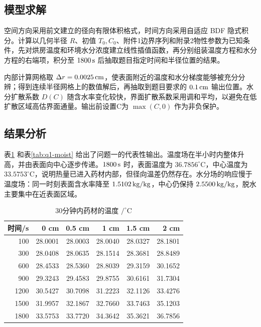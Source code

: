 \documentclass[UTF8,a4paper,12pt]{ctexart}
\begin{document}
\subsection{模型求解}
空间方向采用前文建立的径向有限体积格式，时间方向采用自适应 BDF 隐式积分。计算以几何半径 $R$、初值 $T_0,C_0$、附件1边界序列和附录2物性参数为已知条件，先对烘房温度和环境水分浓度建立线性插值函数，再分别组装温度方程和水分方程的右端项，积分至 $1800\rm\,s$ 后抽取题目指定时间和半径位置的结果。

内部计算网格取 $\Delta r=0.0025\rm\,cm$，使表面附近的温度和水分梯度能够被充分分辨；得到连续半径网格上的数值解后，再抽取到题目要求的 $0.1\rm\,cm$ 输出位置。水分扩散系数 $D(C)$ 随含水率变化较快，界面扩散系数采用调和平均，以避免在低扩散区域高估界面通量。输出前设置C为 $\max(C,0)$ 作为非负保护。

\subsection{结果分析}
表\ref{tab:q1-temp} 和表\ref{tab:q1-moist} 给出了问题一的代表性输出。温度场在半小时内整体升高，并由表面向中心逐步传递。$1800\rm\,s$ 时，表面温度为 $36.7856^\circ\mathrm C$，中心温度为 $33.5753^\circ\mathrm C$，说明热量已进入药材内部，但径向温差仍然存在。水分场的响应慢于温度场：同一时刻表面含水率降至 $1.5102\rm\,kg/kg$，中心仍保持 $2.5500\rm\,kg/kg$，脱水主要集中在近表面区域。

\begin{table}[H]
  \centering
  \caption{30分钟内药材的温度 $/^\circ\mathrm C$}
  \label{tab:q1-temp}
  \begin{tabular}{rrrrrr}
    \toprule
    时间/s & 0 cm & 0.5 cm & 1 cm & 1.5 cm & 2 cm\\ \midrule
    100 & 28.0001 & 28.0003 & 28.0040 & 28.0327 & 28.1801\\
    300 & 28.0408 & 28.0635 & 28.1514 & 28.3681 & 28.8489\\
    600 & 28.4533 & 28.5360 & 28.8039 & 29.3159 & 30.1652\\
    900 & 29.3243 & 29.4583 & 29.8755 & 30.6161 & 31.7304\\
    1200 & 30.5427 & 30.7098 & 31.2223 & 32.1126 & 33.4276\\
    1500 & 31.9957 & 32.1867 & 32.7660 & 33.7463 & 35.1203\\
    1800 & 33.5753 & 33.7720 & 34.3642 & 35.3621 & 36.7856\\
    \bottomrule
  \end{tabular}
\end{table}
\end{document}
